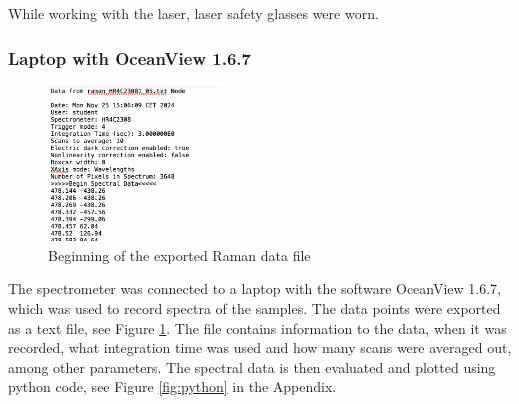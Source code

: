 While working with the laser, laser safety glasses were worn. 

\subsubsection{Laptop with OceanView 1.6.7}

\begin{figure}
    \vspace{-20pt}
    \centering
    \includegraphics[width=0.4\textwidth]{images/data_raman.png}
    \vspace{-30pt}
    \caption{Beginning of the exported Raman data file}
    \label{fig:raman_txt}
    \vspace{-10pt}
\end{figure}
The spectrometer was connected to a laptop with the software OceanView 1.6.7, which was used to record spectra of the samples. The data points were exported as a text file, see Figure \ref{fig:raman_txt}. The file contains information to the data, when it was recorded, what integration time was used and how many scans were averaged out, among other parameters. The spectral data is then evaluated and plotted using python code, see Figure \ref{fig:python} in the Appendix.

\bigskip

